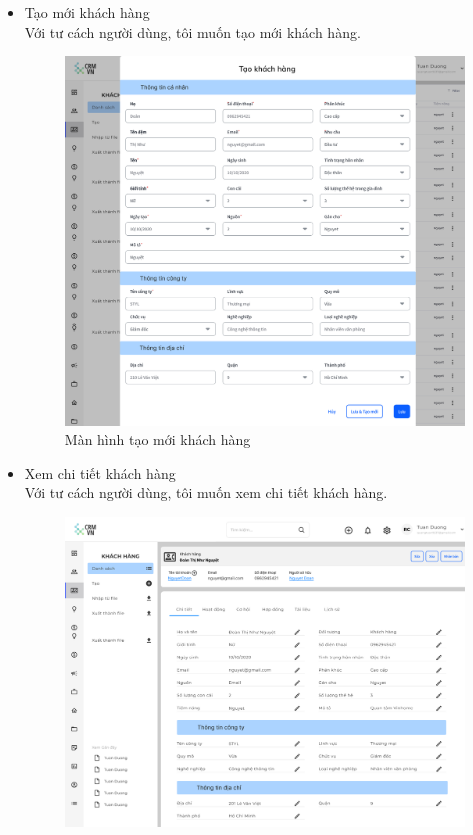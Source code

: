 \documentclass[12pt,a4paper]{article}
\begin{document}
\begin{enumerate}
\begin{itemize}
            \item Tạo mới khách hàng \\
            Với tư cách người dùng, tôi muốn tạo mới khách hàng.
            \begin{figure}[H]
                \centering \includegraphics[width=\textwidth]{Img/Nguyet/Khachhang/themKH.png}
                \vspace{0.5cm}
                \caption{Màn hình tạo mới khách hàng}
                \label{taoKH}
            \end{figure}
            \item Xem chi tiết khách hàng \\
            Với tư cách người dùng, tôi muốn xem chi tiết khách hàng.
            \begin{figure}[H]
                \centering \includegraphics[width=\textwidth]{Img/Nguyet/Khachhang/chitietkhachhang.png}

\end{figure}
\end{itemize}
\end{enumerate}
\end{document}
